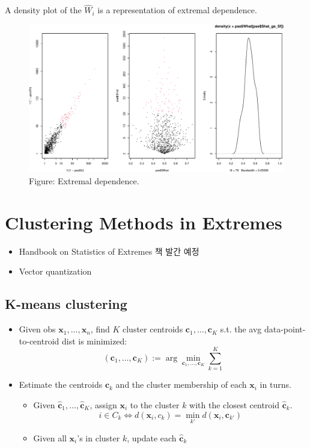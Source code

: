 \documentclass[
  letterpaper,
  DIV=11,
  numbers=noendperiod]{scrreprt}
\providecommand{\tightlist}{%
  \setlength{\itemsep}{0pt}\setlength{\parskip}{0pt}}
\theoremstyle{definition}
\theoremstyle{plain}
\theoremstyle{plain}
\theoremstyle{definition}
\theoremstyle{plain}
\theoremstyle{definition}
\theoremstyle{remark}
\begin{document}
A density plot of the \(\hat{W}_i\) is a representation of extremal
dependence.

\begin{figure}[H]

{\centering \includegraphics[width=0.7\linewidth,height=\textheight,keepaspectratio]{mev_files/figure-pdf/unnamed-chunk-1-1.pdf}

}

\caption{Figure: Extremal dependence.}

\end{figure}%

\section{Clustering Methods in
Extremes}\label{clustering-methods-in-extremes}

\begin{itemize}
\item
  Handbook on Statistics of Extremes 책 발간 예정
\item
  Vector quantization
\end{itemize}

\subsection{K-means clustering}\label{k-means-clustering}

\begin{itemize}
\item
  Given obs \(\pmb{x}_1, \ldots, \pmb{x}_n\), find \(K\) cluster
  centroids \(\pmb{c}_1, \ldots, \pmb{c}_K\) s.t. the avg
  data-point-to-centroid dist is minimized: \[
  (\pmb{c}_1, \ldots, \pmb{c}_K) := \arg\min_{\pmb{c}_1, \ldots, \pmb{c}_K} \sum_{k=1}^K 
  \]
\item
  Estimate the centroids \(\pmb{c}_k\) and the cluster membership of
  each \(\pmb{x}_i\) in turns.

  \begin{itemize}
  \tightlist
  \item
    Given \(\hat{\pmb{c}}_1, \ldots, \hat{\pmb{c}}_K\), assign
    \(\pmb{x}_i\) to the cluster \(k\) with the closest centroid
    \(\hat{\pmb{c}}_k\). \[
    i \in C_k \Longleftrightarrow d(\pmb{x}_i, c_k) = \min_{k'}d(\pmb{x}_i, \pmb{c}_{k'})
    \]
  \item
    Given all \(\pmb{x}_i\)'s in cluster \(k\), update each
    \(\hat{\pmb{c}}_k\)
  \end{itemize}
\end{itemize}
\end{document}
